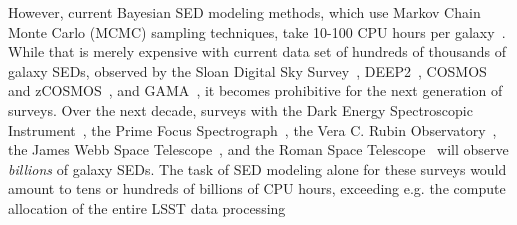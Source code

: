 However, current Bayesian SED modeling methods, which use Markov Chain Monte
Carlo (MCMC) sampling techniques, take 10-100 CPU hours per
galaxy~\citep[\emph{e.g.}][]{carnall2019a, tacchella2021}. 
While that is merely expensive with current data set of hundreds of thousands of 
galaxy SEDs, observed by the Sloan Digital Sky Survey~\citep[SDSS;][]{york2000},
DEEP2~\citep{davis2003}, COSMOS and zCOSMOS~\citep{scoville2007, lilly2007},
and GAMA~\citep{baldry2018}, it becomes prohibitive for the next generation of surveys.
Over the next decade, surveys with the 
Dark Energy Spectroscopic Instrument~\citep[DESI;][]{desicollaboration2016},
the Prime Focus Spectrograph~\citep[PFS;][]{takada2014}, 
the Vera C. Rubin Observatory~\citep{ivezic2019}, 
the James Webb Space Telescope~\citep{gardner2006},
and the Roman Space Telescope~\citep{spergel2015} will observe \emph{billions}
of galaxy SEDs.
The task of SED modeling alone for these surveys would amount to tens or hundreds of billions of CPU hours, exceeding e.g. the compute allocation of the entire LSST data processing 


